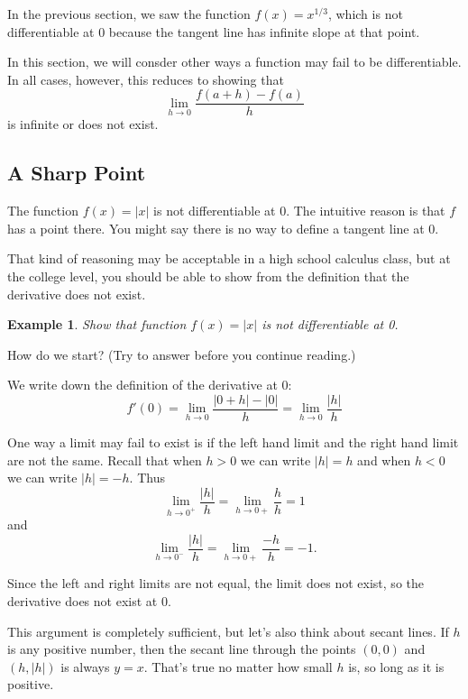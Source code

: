 \documentclass[11pt]{book}
\newtheorem{example}{Example}
\numberwithin{example}{chapter}
\begin{document}
In the previous section, we saw the function $f(x)=x^{1/3}$, which is not differentiable at 0 because the tangent line has infinite slope at that point.  

In this section, we will consder other ways a function may fail to be differentiable.  In all cases, however, this reduces to showing that
$$\lim_{h\to 0}\frac{f(a+h)-f(a)}{h}$$
is infinite or does not exist.

\subsection{A Sharp Point}

The function $f(x)=|x|$ is not differentiable at 0.  The intuitive reason is that $f$ has a point there.  You might say there is no way to define a tangent line at 0.  

That kind of reasoning may be acceptable in a high school calculus class, but at the college level, you should be able to show from the definition that the derivative does not exist.

\begin{example}
Show that function $f(x)=|x|$ is not differentiable at 0.
\end{example}

How do we start?  (Try to answer before you continue reading.)

We write down the definition of the derivative at 0:
$$f'(0) = \lim_{h\to 0}\frac{|0+h|-|0|}{h}= \lim_{h\to 0}\frac{|h|}{h}$$

One way a limit may fail to exist is if the left hand limit and the right hand limit are not the same.  Recall that when $h>0$ we can write $|h|=h$ and when $h<0$ we can write $|h|=-h$.  Thus
$$\lim_{h\to 0^+}\frac{|h|}{h}=\lim_{h\to 0+}\frac{h}{h}=1$$ 
and 
$$\lim_{h\to 0^-}\frac{|h|}{h}=\lim_{h\to 0+}\frac{-h}{h}=-1.$$ 



Since the left and right limits are not equal, the limit does not exist, so the derivative does not exist at 0.  

This argument is completely sufficient, but let's also think about secant lines.  If $h$ is any positive number, then the secant line through the points $(0,0)$ and $(h,|h|)$ is always $y=x$.  That's true no matter how small $h$ is, so long as it is positive. 


\begin{center}
\end{center}
\end{document}
